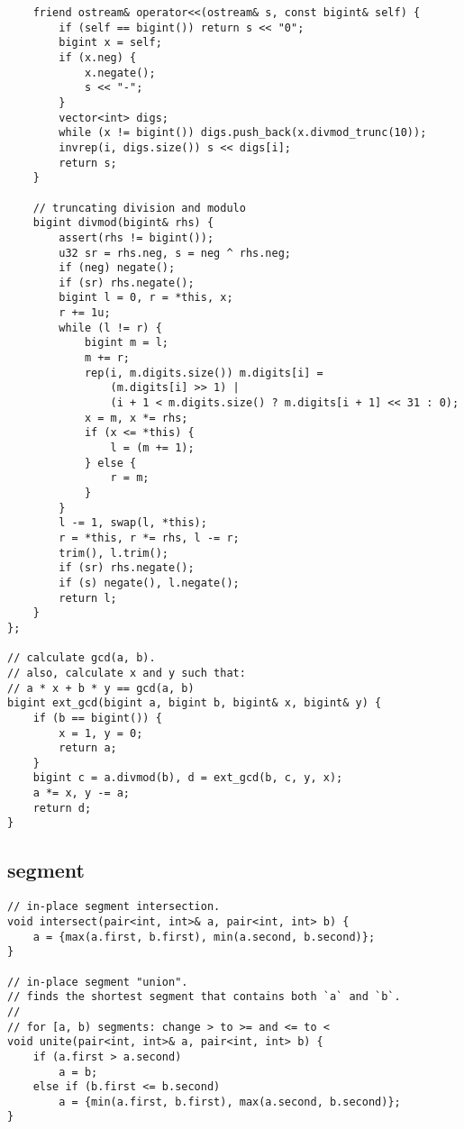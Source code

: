 \documentclass[twoside]{article}
\begin{document}
\begin{multicols*}{2}
\begin{verbatim}
    friend ostream& operator<<(ostream& s, const bigint& self) {
        if (self == bigint()) return s << "0";
        bigint x = self;
        if (x.neg) {
            x.negate();
            s << "-";
        }
        vector<int> digs;
        while (x != bigint()) digs.push_back(x.divmod_trunc(10));
        invrep(i, digs.size()) s << digs[i];
        return s;
    }

    // truncating division and modulo
    bigint divmod(bigint& rhs) {
        assert(rhs != bigint());
        u32 sr = rhs.neg, s = neg ^ rhs.neg;
        if (neg) negate();
        if (sr) rhs.negate();
        bigint l = 0, r = *this, x;
        r += 1u;
        while (l != r) {
            bigint m = l;
            m += r;
            rep(i, m.digits.size()) m.digits[i] =
                (m.digits[i] >> 1) |
                (i + 1 < m.digits.size() ? m.digits[i + 1] << 31 : 0);
            x = m, x *= rhs;
            if (x <= *this) {
                l = (m += 1);
            } else {
                r = m;
            }
        }
        l -= 1, swap(l, *this);
        r = *this, r *= rhs, l -= r;
        trim(), l.trim();
        if (sr) rhs.negate();
        if (s) negate(), l.negate();
        return l;
    }
};

// calculate gcd(a, b).
// also, calculate x and y such that:
// a * x + b * y == gcd(a, b)
bigint ext_gcd(bigint a, bigint b, bigint& x, bigint& y) {
    if (b == bigint()) {
        x = 1, y = 0;
        return a;
    }
    bigint c = a.divmod(b), d = ext_gcd(b, c, y, x);
    a *= x, y -= a;
    return d;
}
\end{verbatim}

{
\subsection*{segment}
}
\begin{verbatim}
// in-place segment intersection.
void intersect(pair<int, int>& a, pair<int, int> b) {
    a = {max(a.first, b.first), min(a.second, b.second)};
}

// in-place segment "union".
// finds the shortest segment that contains both `a` and `b`.
//
// for [a, b) segments: change > to >= and <= to <
void unite(pair<int, int>& a, pair<int, int> b) {
    if (a.first > a.second)
        a = b;
    else if (b.first <= b.second)
        a = {min(a.first, b.first), max(a.second, b.second)};
}


\end{verbatim}
\end{multicols*}
\end{document}
